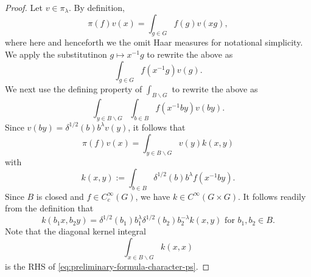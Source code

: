 \documentclass[reqno]{amsart} 
\begin{document}
\begin{proof}
  Let $v \in \pi_\lambda$.  By definition,
  \begin{equation*}
\pi(f) v(x)
    = \int _{g \in G} f(g) v(x g),
  \end{equation*}
  where here and henceforth we the omit Haar measures for notational simplicity.  We apply the substitutinon $g \mapsto x^{-1} g$ to rewrite the above as
  \begin{equation*}
    \int_{g \in G} f(x^{-1} g) v(g).
  \end{equation*}
  We next use the defining property of $\int_{B \backslash G}$ to rewrite the above as
  \begin{equation*}
    \int _{y \in B \backslash G} \int _{b \in B} f (x ^{-1} b y) v (b y).
  \end{equation*}
  Since $v(b y) = \delta^{1/2}(b) b^{\lambda} v(y)$, it follows that
  \begin{equation}\label{eq:pi-of-f-via-k}
    \pi(f) v(x)
    = \int _{y \in B \backslash G}
    v(y) k(x,y)
  \end{equation}
  with
  \begin{equation*}
    k(x,y) := \int _{b \in B} \delta^{1/2}(b) b^{\lambda} f(x^{-1} b y).
  \end{equation*}
  Since $B$ is closed and $f \in C_c^\infty(G)$, we have $k \in C^\infty(G \times G)$.  It follows readily from the definition that
  \begin{equation}\label{eq:functional-eqn-for-k-kernel-ps}
    k(b_1 x, b_2 y) = \delta^{1/2} (b_1) b_1^{\lambda}
    \delta^{1/2} (b_2) b_2^{-\lambda} k(x,y)
    \text{ for } b_1, b_2 \in B.
  \end{equation}
  Note that the diagonal kernel integral
  \begin{equation}\label{eq:diagonal-kernel-integral}
    \int_{x \in B \backslash G} k(x,x)
  \end{equation}
  is the RHS of \eqref{eq:preliminary-formula-character-ps}.


\end{proof}
\end{document}
